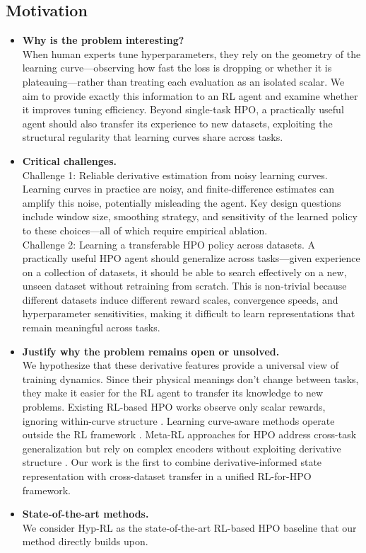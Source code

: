 \subsection{Motivation}

\begin{itemize}
    \item \textbf{Why is the problem interesting?}\\
    When human experts tune hyperparameters, they rely on the geometry of the learning curve---observing how fast the loss is dropping or whether it is plateauing---rather than treating each evaluation as an isolated scalar. We aim to provide exactly this information to an RL agent and examine whether it improves tuning efficiency. Beyond single-task HPO, a practically useful agent should also transfer its experience to new datasets, exploiting the structural regularity that learning curves share across tasks.

    \item \textbf{Critical challenges.}\\
    Challenge 1: Reliable derivative estimation from noisy learning curves.
    Learning curves in practice are noisy, and finite-difference estimates can amplify this noise, potentially misleading the agent. Key design questions include window size, smoothing strategy, and sensitivity of the learned policy to these choices---all of which require empirical ablation.\\
    Challenge 2: Learning a transferable HPO policy across datasets.
    A practically useful HPO agent should generalize across tasks---given experience on a collection of datasets, it should be able to search effectively on a new, unseen dataset without retraining from scratch. This is non-trivial because different datasets induce different reward scales, convergence speeds, and hyperparameter sensitivities, making it difficult to learn representations that remain meaningful across tasks.

    \item \textbf{Justify why the problem remains open or unsolved.}\\
    We hypothesize that these derivative features provide a universal view of training dynamics. Since their physical meanings don't change between tasks, they make it easier for the RL agent to transfer its knowledge to new problems. Existing RL-based HPO works observe only scalar rewards, ignoring within-curve structure \citep{jomaa2019hyp}. Learning curve-aware methods operate outside the RL framework \citep{wistuba2022dyhpo}. Meta-RL approaches for HPO address cross-task generalization but rely on complex encoders without exploiting derivative structure \citep{albrechts2024model, wu2023hyperparameter}. Our work is the first to combine derivative-informed state representation with cross-dataset transfer in a unified RL-for-HPO framework.

    \item \textbf{State-of-the-art methods.}\\
    We consider Hyp-RL \citep{jomaa2019hyp} as the state-of-the-art RL-based HPO baseline that our method directly builds upon.
\end{itemize}